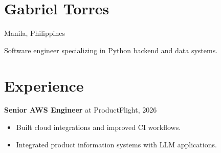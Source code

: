 \documentclass[11pt,a4paper]{article}
\begin{document}
\section*{Gabriel Torres}

Manila, Philippines

Software engineer specializing in Python backend and data systems.

\section*{Experience}

\textbf{Senior AWS Engineer} at ProductFlight, 2026

\begin{itemize}
  \item Built cloud integrations and improved CI workflows.
  \item Integrated product information systems with LLM applications.
\end{itemize}
\end{document}
